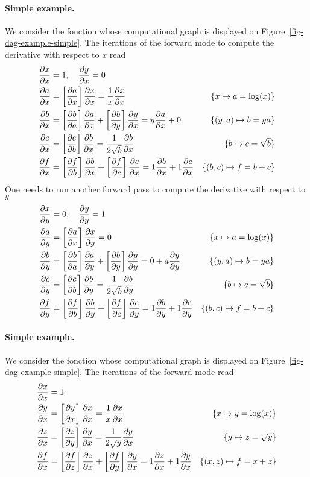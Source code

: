 \paragraph{Simple example.}


We consider the fonction 
whose computational graph is displayed on Figure~\ref{fig-dag-example-simple}. The iterations of the forward mode to compute the derivative with respect to $x$ read
\begin{align*}
		\pd{x}{x} &= 1,  \quad \pd{y}{x} = 0 \\
		\pd{a}{x} &= \bk{\pd{a}{x}} \pd{x}{x} = \frac{1}{x} \pd{x}{x} &
			\{x \mapsto a = \log(x)\}\\
		\pd{b}{x} &= \bk{\pd{b}{a}} \pd{a}{x}  + \bk{\pd{b}{y}} \pd{y}{x}  = y \pd{a}{x} + 0 &
			\{(y,a) \mapsto b=ya\}\\
		\pd{c}{x} &= \bk{\pd{c}{b}} \pd{b}{x}  = \frac{1}{2\sqrt{b}} \pd{b}{x}&
			\{b \mapsto c=\sqrt{b}\} \\
		\pd{f}{x} &= \bk{\pd{f}{b}} \pd{b}{x} + \bk{\pd{f}{c}} \pd{c}{x}  = 1\pd{b}{x} + 1\pd{c}{x}&
			\{(b,c) \mapsto f=b+c\}
\end{align*}
One needs to run another forward pass to compute the derivative with respect to $y$
\begin{align*}
		\pd{x}{y} &= 0,  \quad \pd{y}{y} = 1 \\
		\pd{a}{y} &= \bk{\pd{a}{x}} \pd{x}{y} = 0 &
			\{x \mapsto a = \log(x)\}\\
		\pd{b}{y} &= \bk{\pd{b}{a}} \pd{a}{y}  + \bk{\pd{b}{y}} \pd{y}{y}  = 0 + a \pd{y}{y}  &
			\{(y,a) \mapsto b=ya\}\\
		\pd{c}{y} &= \bk{\pd{c}{b}} \pd{b}{y}  = \frac{1}{2\sqrt{b}} \pd{b}{y}&
			\{b \mapsto c=\sqrt{b}\} \\
		\pd{f}{y} &= \bk{\pd{f}{b}} \pd{b}{y} + \bk{\pd{f}{c}} \pd{c}{y}  = 1\pd{b}{y} + 1\pd{c}{y}&
			\{(b,c) \mapsto f=b+c\}
\end{align*}




\paragraph{Simple example.}

We consider the fonction 
whose computational graph is displayed on Figure~\ref{fig-dag-example-simple}. The iterations of the forward mode read
\begin{align*}
		\pd{x}{x} &= 1 \\
		\pd{y}{x} &= \bk{\pd{y}{x}} \pd{x}{x} = \frac{1}{x} \pd{x}{x} &
			\{x \mapsto y = \log(x)\}\\
		\pd{z}{x} &= \bk{\pd{z}{y}} \pd{y}{x} = \frac{1}{2\sqrt{y}} \pd{y}{x} &
			\{y \mapsto z=\sqrt{y}\}\\
		\pd{f}{x} &= \bk{\pd{f}{z}} \pd{z}{x} + \bk{\pd{f}{y}} \pd{y}{x} = 1 \pd{z}{x} + 1 \pd{y}{x}&
			\{(x,z) \mapsto f=x+z\}
\end{align*}



